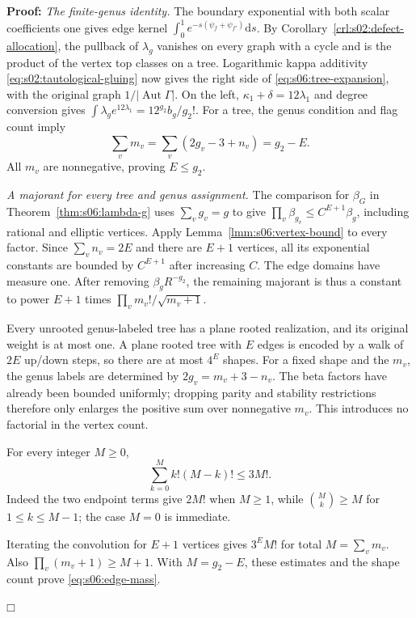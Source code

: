 \documentclass[a4paper,10pt]{article}
\numberwithin{equation}{section}
\newcommand{\dd}{\mathrm{d}}
\theoremstyle{paperplain}
\theoremstyle{paperremark}
\theoremstyle{paperplain}
\newenvironment{prf}{\noindent \textbf{Proof: }}{\hfill $\mdlgwhtsquare$\par\addvspace{0.5\baselineskip}}
\begin{document}
\begin{prf}
\emph{The finite-genus identity.}
The boundary exponential with both scalar coefficients one gives
edge kernel $\int_0^1e^{-s(\psi_f+\psi_{f'})}\dd s$.
By Corollary~\ref{crl:s02:defect-allocation}, the pullback of
$\lambda_g$ vanishes on every graph with a cycle and is the product
of the vertex top classes on a tree. Logarithmic kappa additivity
\eqref{eq:s02:tautological-gluing} now gives the right side of
\eqref{eq:s06:tree-expansion}, with the original graph
$1/|\operatorname{Aut}\Gamma|$.
On the left, $\kappa_1+\delta=12\lambda_1$ and degree conversion
gives $\int\lambda_ge^{12\lambda_1}=12^{g_2}b_g/g_2!$.
For a tree, the genus condition and flag count imply
\begin{equation}\label{eq:s06:tree-degree}
 \sum_v m_v=\sum_v(2g_v-3+n_v)=g_2-E.
\end{equation}
All $m_v$ are nonnegative, proving $E\leq g_2$.

\emph{A majorant for every tree and genus assignment.}
The comparison for $\beta_G$ in Theorem~\ref{thm:s06:lambda-g}
uses $\sum_v g_v=g$ to give
$\prod_v\beta_{g_v}\leq C^{E+1}\beta_g$, including rational and
elliptic vertices. Apply Lemma~\ref{lmm:s06:vertex-bound} to
every factor. Since $\sum_v n_v=2E$ and there are $E+1$ vertices,
all its exponential constants are bounded by $C^{E+1}$ after
increasing $C$. The edge domains have measure one. After removing
$\beta_gR^{-g_2}$, the remaining majorant is thus a constant to
power $E+1$ times
$\prod_v m_v!/\sqrt{m_v+1}$.

Every unrooted genus-labeled tree has a plane rooted realization,
and its original weight is at most one. A plane rooted tree with
$E$ edges is encoded by a walk of $2E$ up/down steps, so there are
at most $4^E$ shapes. For a fixed shape and the $m_v$, the genus
labels are determined by $2g_v=m_v+3-n_v$. The beta factors have
already been bounded uniformly; dropping parity and stability restrictions
therefore only enlarges the positive sum over nonnegative $m_v$.
This introduces no factorial in the vertex count.

For every integer $M\geq0$,
\begin{equation}\label{eq:s06:factorial-convolution}
 \sum_{k=0}^M k!(M-k)!\leq3M!.
\end{equation}
Indeed the two endpoint terms give $2M!$ when $M\geq1$, while
$\binom{M}{k}\geq M$ for $1\leq k\leq M-1$; the case $M=0$
is immediate.

Iterating the convolution for $E+1$ vertices gives
$3^EM!$ for total $M=\sum_v m_v$. Also
$\prod_v(m_v+1)\geq M+1$. With $M=g_2-E$, these estimates and
the shape count prove \eqref{eq:s06:edge-mass}.


\end{prf}
\end{document}
